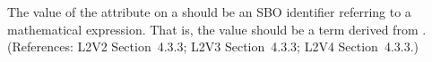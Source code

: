 The value of the  attribute on a \FunctionDefinition should be an
SBO identifier referring to a mathematical expression.  That is, the value
should be a term derived from \sbomathformula.  (References: L2V2 Section~4.3.3;
L2V3 Section~4.3.3; L2V4 Section~4.3.3.)

